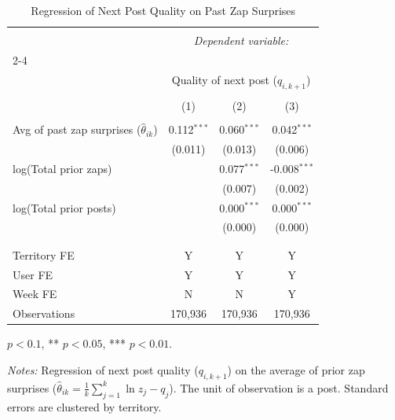 \begin{table}[H]
\centering
\caption{Regression of Next Post Quality on Past Zap Surprises} \label{tbl_v4v_qreg}
\begin{threeparttable}
\begin{tabular}{@{\extracolsep{5pt}}lccc} 
\\[-1.8ex]\hline 
\hline \\[-1.8ex] 
 & \multicolumn{3}{c}{\textit{Dependent variable:}} \\ 
\cline{2-4} 
\\[-1.8ex] & \multicolumn{3}{c}{Quality of next post ($q_{i,k+1}$)} \\ 
\\[-1.8ex] & (1) & (2) & (3) \\ 
\hline \\[-1.8ex] 
Avg of past zap surprises ($\hat{\theta}_{ik}$)  & 0.112$^{***}$ & 0.060$^{***}$ & 0.042$^{***}$ \\
 & (0.011) & (0.013) & (0.006) \\
log(Total prior zaps)  &  & 0.077$^{***}$ & -0.008$^{***}$ \\
 &  & (0.007) & (0.002) \\
log(Total prior posts)  &  & 0.000$^{***}$ & 0.000$^{***}$ \\
 &  & (0.000) & (0.000) \\
& & & \\
\hline \\ [-1.8ex]
Territory FE            & Y & Y & Y \\
User FE                 & Y & Y & Y \\
Week FE                 & N & N & Y \\
Observations  & 170,936 & 170,936 & 170,936 \\ \hline \hline 
\end{tabular} 
\begin{tablenotes}[flushleft]\footnotesize
\item[] \parbox[t]{\linewidth}{%
\hfill * $p<0.1$, ** $p<0.05$, *** $p<0.01$.
}
\item \textit{Notes:} Regression of next post quality ($q_{i,k+1}$) on the average of prior zap surprises ($\hat{\theta}_{ik} = \frac{1}{k} \sum_{j=1}^{k} \ln z_j - q_j$). The unit of observation is a post. Standard errors are clustered by territory.
\end{tablenotes}
\end{threeparttable}
\end{table}
